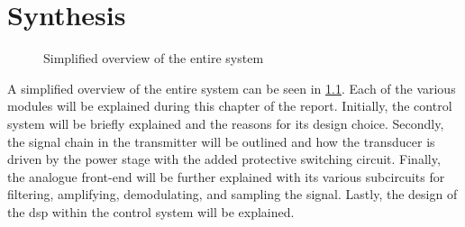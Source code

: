 \chapter{Synthesis} \label{cha:synthesis} %
\begin{figure}[ht]
	\centering
	\resizebox{\textwidth}{!}{
		
	}
	\caption[Simplified overview of the entire system]{Simplified overview of the entire system}
	\label{fig:1_system_overview}
\end{figure}
A simplified overview of the entire system can be seen in \cref{fig:1_system_overview}. Each of the various modules will be explained during this chapter of the report. Initially, the control system will be briefly explained and the reasons for its design choice. Secondly, the signal chain in the transmitter will be outlined and how the transducer is driven by the power stage with the added protective switching circuit. Finally, the analogue front-end will be further explained with its various subcircuits for filtering, amplifying, demodulating, and sampling the signal. Lastly, the design of the \gls{dsp} within the control system will be explained.


